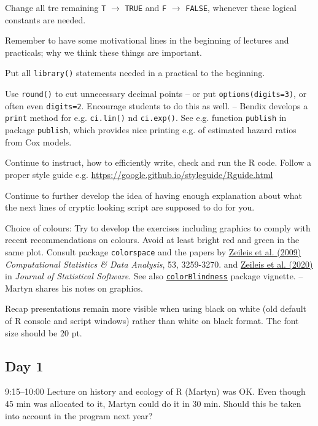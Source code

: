 \documentclass[11pt,a4]{article}
\begin{document}
Change all tre remaining {\tt T} $\to$ {\tt TRUE} and {\tt F} $\to$ {\tt FALSE},
whenever these logical constants are needed.

Remember to have some motivational lines in the beginning of lectures and practicals; 
why we think these things are important. 

Put all {\tt library()} statements needed in a practical to the beginning.

Use {\tt round()} to cut unnecessary decimal points -- 
or put {\tt options(digits=3)}, or often even {\tt digits=2}. Encourage students to do this as well.
-- Bendix develops a \texttt{print} method for e.g. \texttt{ci.lin()} nd \texttt{ci.exp()}.
See e.g. function \texttt{publish} in package \texttt{publish}, which
provides nice printing e.g. of estimated hazard ratios from Cox models.  

Continue to instruct, how to efficiently write, check and run the R code. 
Follow a proper style guide e.g. \url{https://google.github.io/styleguide/Rguide.html}

Continue to further develop the idea of having enough explanation about what the 
next lines of cryptic looking script are supposed to do for you.

Choice of colours: Try to develop the exercises including graphics to comply with
recent recommendations on colours.  Avoid at least bright red and green in the same plot. 
Consult package {\tt colorspace} and the papers by 
\href{https://doi.org/10.1016/j.csda.2008.11.033}{\color{blue}Zeileis et al. (2009)}
 {\it Computational Statistics \& Data Analysis}, 53, 3259-3270.
and \href{https://doi.org/10.18637/jss.v096.i01}{\color{blue}Zeileis et al. (2020)}
in {\it Journal of Statistical Software}. See also 
\href{https://cran.r-project.org/web/packages/colorBlindness/vignettes/colorBlindness.html}{\color{blue}\texttt{colorBlindness}} package vignette. -- Martyn shares his notes on graphics.

Recap presentations remain more visible when using black 
on white (old default of R console and script windows)
 rather than white on black format. The font size should be 20 pt.

\subsection*{Day 1}

9:15--10:00 Lecture on history and ecology of R (Martyn) was OK. Even though 45 min was allocated to it,
Martyn could do it in 30 min. Should this be taken into account in the program next year?  
\end{document}
